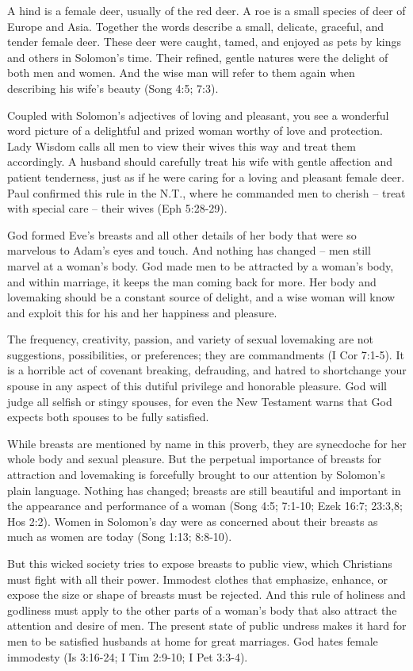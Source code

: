 A hind is a female deer, usually of the red deer. A roe is a small species of deer of Europe and Asia. Together the words describe a small, delicate, graceful, and tender female deer. These deer were caught, tamed, and enjoyed as pets by kings and others in Solomon’s time. Their refined, gentle natures were the delight of both men and women. And the wise man will refer to them again when describing his wife’s beauty (Song 4:5; 7:3).

Coupled with Solomon’s adjectives of loving and pleasant, you see a wonderful word picture of a delightful and prized woman worthy of love and protection. Lady Wisdom calls all men to view their wives this way and treat them accordingly. A husband should carefully treat his wife with gentle affection and patient tenderness, just as if he were caring for a loving and pleasant female deer. Paul confirmed this rule in the N.T., where he commanded men to cherish – treat with special care – their wives (Eph 5:28-29).

God formed Eve’s breasts and all other details of her body that were so marvelous to Adam’s eyes and touch. And nothing has changed – men still marvel at a woman’s body. God made men to be attracted by a woman’s body, and within marriage, it keeps the man coming back for more. Her body and lovemaking should be a constant source of delight, and a wise woman will know and exploit this for his and her happiness and pleasure.

The frequency, creativity, passion, and variety of sexual lovemaking are not suggestions, possibilities, or preferences; they are commandments (I Cor 7:1-5). It is a horrible act of covenant breaking, defrauding, and hatred to shortchange your spouse in any aspect of this dutiful privilege and honorable pleasure. God will judge all selfish or stingy spouses, for even the New Testament warns that God expects both spouses to be fully satisfied.

While breasts are mentioned by name in this proverb, they are synecdoche for her whole body and sexual pleasure. But the perpetual importance of breasts for attraction and lovemaking is forcefully brought to our attention by Solomon’s plain language. Nothing has changed; breasts are still beautiful and important in the appearance and performance of a woman (Song 4:5; 7:1-10; Ezek 16:7; 23:3,8; Hos 2:2). Women in Solomon’s day were as concerned about their breasts as much as women are today (Song 1:13; 8:8-10).

But this wicked society tries to expose breasts to public view, which Christians must fight with all their power. Immodest clothes that emphasize, enhance, or expose the size or shape of breasts must be rejected. And this rule of holiness and godliness must apply to the other parts of a woman’s body that also attract the attention and desire of men. The present state of public undress makes it hard for men to be satisfied husbands at home for great marriages. God hates female immodesty (Is 3:16-24; I Tim 2:9-10; I Pet 3:3-4).

